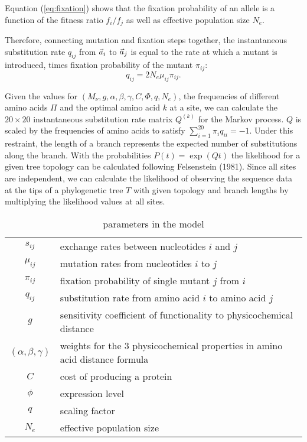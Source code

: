Equation (\ref{eq:fixation}) shows that the fixation probability of an allele is a function of the fitness ratio $f_i/f_j$ as well as effective population size $N_e$.


Therefore, connecting mutation and fixation steps together, the instantaneous substitution rate $q_{ij}$ from $\vec{a}_i$ to $\vec{a}_j$ is equal to the rate at which a mutant is introduced,  times fixation probability of the mutant $\pi_{ij}$:
\begin{equation}
q_{ij} = 2N_e \mu_{ij} \pi_{ij}.
\label{eq:subrate}
\end{equation}


Given the values for $\left(M_{\nu},g, \alpha, \beta, \gamma, C, \Phi, q, N_e\right)$, the frequencies of different amino acids $\Pi$ and the optimal amino acid $k$ at a site, we can calculate the $20 \times 20$ instantaneous substitution rate matrix $Q^{(k)}$ for the Markov process. 
$Q$ is scaled by the frequencies of amino acids to satisfy $\sum_{i=1}^{20} \pi_i q_{ii}= -1$.
Under this restraint, the length of a branch represents the expected number of substitutions along the branch.
With the probabilities $P(t)  = \exp\left(Q t\right)$ the likelihood for a given tree topology can be calculated following Felsenstein (1981).
Since all sites are independent, we can calculate the likelihood of observing the sequence data at the tips of a phylogenetic tree $T$ with given topology and branch lengths by multiplying the likelihood values at all sites.\\

\begin{table}[h]
\centering
\caption{parameters in the model}
\begin{tabular}{ c p{10cm} }
\hline
$s_{ij}$ & exchange rates between nucleotides $i$ and $j$ \\
$\mu_{ij}$ & mutation rates from nucleotides $i$ to $j$\\
$\pi_{ij}$ & fixation probability of single mutant $j$ from $i$\\
$q_{ij}$ & substitution rate from amino acid $i$ to amino acid $j$\\
$g$       & sensitivity coefficient of functionality to physicochemical distance \\
$(\alpha,\beta,\gamma)$ & weights for the 3 physicochemical properties in amino acid distance formula \\
$C$ & cost of producing a protein\\
$\phi$ & expression level \\
$q$ & scaling factor \\
$N_e$ & effective population size \\
\hline
\end{tabular}

\label{tb: para}
\end{table}

